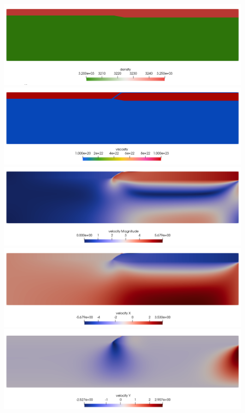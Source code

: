 \newpage
\begin{center}
\includegraphics[width=12.5cm]{python_codes/fieldstone_62/results/density}\\
\includegraphics[width=12.5cm]{python_codes/fieldstone_62/results/viscosity}\\
\includegraphics[width=12.5cm]{python_codes/fieldstone_62/results/velocity}\\
\includegraphics[width=12.5cm]{python_codes/fieldstone_62/results/u}\\
\includegraphics[width=12.5cm]{python_codes/fieldstone_62/results/v}\\
\end{center}

